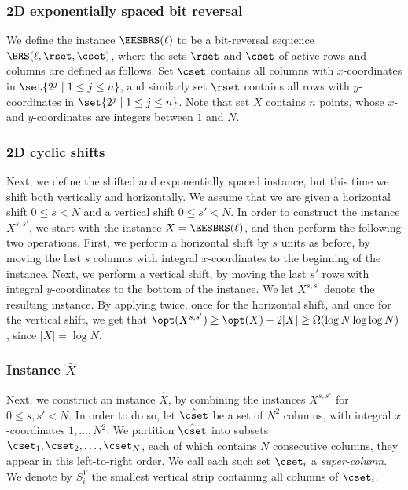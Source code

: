\subsubsection{2D exponentially spaced bit reversal} 

We define the instance $\EESBRS(\ell)$ to be a bit-reversal sequence $\BRS(\ell,\rset,\cset)$, where the sets $\rset$ and $\cset$ of active rows and columns are defined as follows. Set $\cset$ contains all columns with $x$-coordinates in $\set{2^j\mid 1\leq j\leq n}$, and similarly set $\rset$ contains all rows with $y$-coordinates in $\set{2^j\mid 1\leq j\leq n}$. Note that set $X$ contains $n$ points, whose $x$- and $y$-coordinates are integers between $1$ and $N$.


 

%
%
	
	
\subsubsection{2D cyclic shifts} 

Next, we define the shifted and exponentially spaced instance, but this time we shift both vertically and horizontally. 
We assume that we are given a horizontal shift $0\leq s<N$ and a vertical shift $0\leq s'<N$. 
In order to construct the instance $X^{s,s'}$, we start with the instance $X=\EESBRS(\ell)$, and then perform the following two operations. 
First, we perform a horizontal shift by $s$ units as before, by moving the last $s$ columns with integral $x$-coordinates  to the beginning of the instance. 
Next, we perform a vertical shift, by moving the last $s'$ rows with integral $y$-coordinates to the bottom of the instance. 
We let $X^{s,s'}$ denote the resulting instance. 
By applying  twice, once for the horizontal shift, and once for the vertical shift, we get that $\opt(X^{s,s'})\geq \opt(X)-2|X|\geq \Omega(\log N\log\log N)$, since $|X|=\log N$.




\subsubsection{Instance $\hat{X}$} 

Next, we construct an instance $\hat X$, by combining the instances $X^{s,s'}$ for $0\leq s,s'<N$. 
In order to do so, let $\hat \cset$ be a set of $N^2$ columns, with integral $x$-coordinates $1,\ldots,N^2$. We partition $\hat \cset$ into subsets $\cset_1, \cset_2,\ldots,\cset_N$, each of which contains $N$ consecutive columns, they appear in this left-to-right order. 
We call each such set $\cset_i$ a \emph{super-column}. We denote by $S^V_i$ the smallest vertical strip containing all columns of $\cset_i$.

